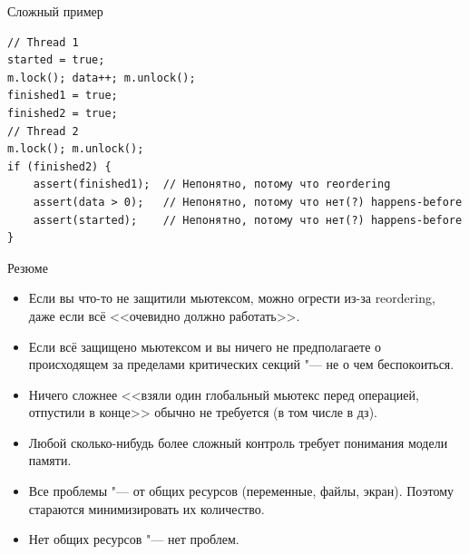 \begin{frame}[fragile]{Сложный пример}
\begin{verbatim}
// Thread 1
started = true;
m.lock(); data++; m.unlock();
finished1 = true;
finished2 = true;
// Thread 2
m.lock(); m.unlock();
if (finished2) {
    assert(finished1);  // Непонятно, потому что reordering
    assert(data > 0);   // Непонятно, потому что нет(?) happens-before
    assert(started);    // Непонятно, потому что нет(?) happens-before
}
\end{verbatim}
\end{frame}

\begin{frame}[fragile]{Резюме}
	\begin{itemize}
		\item Если вы что-то не защитили мьютексом, можно огрести из-за reordering, даже если всё <<очевидно должно работать>>.
		\item Если всё защищено мьютексом и вы ничего не предполагаете о происходящем за пределами критических секций "--- не о чем беспокоиться.
		\item Ничего сложнее <<взяли один глобальный мьютекс перед операцией, отпустили в конце>> обычно не требуется (в том числе в дз).
		\item Любой сколько-нибудь более сложный контроль требует понимания модели памяти.
		\item
			Все проблемы "--- от общих ресурсов (переменные, файлы, экран).
			Поэтому стараются минимизировать их количество.
		\item Нет общих ресурсов "--- нет проблем.
	\end{itemize}
\end{frame}

